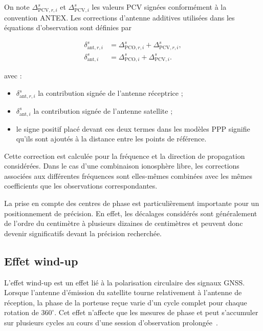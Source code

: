 On note $\Delta_{\mathrm{PCV},r,i}^s$ et
$\Delta_{\mathrm{PCV},i}^{s}$ les valeurs PCV signées conformément à la
convention ANTEX. Les corrections d'antenne additives utilisées dans les
équations d'observation sont définies par

\begin{align}
\delta_{\mathrm{ant},r,i}^s
&=
\Delta_{\mathrm{PCO},r,i}^s+\Delta_{\mathrm{PCV},r,i}^s,
\\
\delta_{\mathrm{ant},i}^{s}
&=
\Delta_{\mathrm{PCO},i}^{s}+\Delta_{\mathrm{PCV},i}^{s}.
\label{eq:antenna_signed_corrections}
\end{align}

avec :

\begin{itemize}
    \item $\delta_{\mathrm{ant},r,i}^s$ la contribution signée de l'antenne
    réceptrice ;
    \item $\delta_{\mathrm{ant},i}^{s}$ la contribution signée de l'antenne
    satellite ;
    \item le signe positif placé devant ces deux termes dans les modèles PPP
    signifie qu'ils sont ajoutés à la distance entre les points de référence.
\end{itemize}

Cette correction est calculée pour la fréquence et la direction de propagation
considérées. Dans le cas d'une combinaison ionosphère libre, les corrections
associées aux différentes fréquences sont elles-mêmes combinées avec les
mêmes coefficients que les observations correspondantes.

La prise en compte des centres de phase est particulièrement importante pour
un positionnement de précision. En effet, les décalages considérés sont
généralement de l'ordre du centimètre à plusieurs dizaines de centimètres et
peuvent donc devenir significatifs devant la précision recherchée.

\subsection{Effet wind-up}\label{windup}

L'effet wind-up est un effet lié à la polarisation circulaire des signaux GNSS. Lorsque l'antenne d'émission du satellite tourne relativement à l'antenne de réception, la phase de la porteuse reçue varie d'un cycle complet pour chaque rotation de $360^\circ$. Cet effet n'affecte que les mesures de phase et peut s'accumuler sur plusieurs cycles au cours d'une session d'observation prolongée~\cite{wu1993}.

